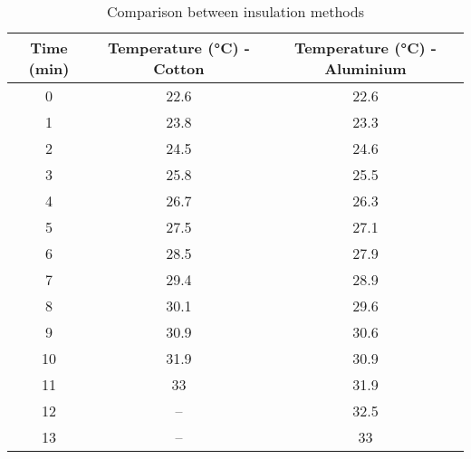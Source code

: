 \begin{table}
    \begin{tabular}{c c c}
        \toprule
        Time (min) & Temperature (\si{\celsius}) - Cotton & Temperature (\si{\celsius}) - Aluminium \\
        \midrule
        0	&	22.6	&	22.6	\\
        1	&	23.8	&	23.3	\\
        2	&	24.5	&	24.6	\\
        3	&	25.8	&	25.5	\\
        4	&	26.7	&	26.3	\\
        5	&	27.5	&	27.1	\\
        6	&	28.5	&	27.9	\\
        7	&	29.4	&	28.9	\\
        8	&	30.1	&	29.6	\\
        9	&	30.9	&	30.6	\\
        10	&	31.9	&	30.9	\\
        11	&	33	&	31.9	\\
        12	&	--	&	32.5	\\
        13	&	--	&	33	\\        
        \bottomrule
    \end{tabular}
    \caption{Comparison between insulation methods}
\end{table}

